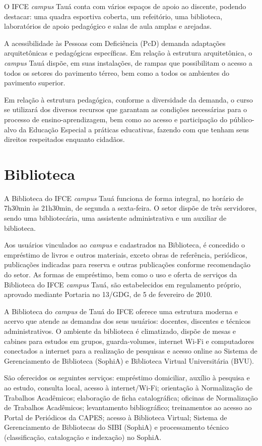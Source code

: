 \documentclass[
	12pt,				%
	openright,			%
	twoside,			%
	a4paper,			%
	chapter=TITLE,		%
	english,			%
	french,				%
	spanish,			%
	brazil,				%
	]{abntex2}
\begin{document}
O IFCE \textit{campus} Tauá conta com vários espaços de apoio ao discente,
podendo destacar: uma quadra esportiva coberta, um refeitório, uma biblioteca, laboratórios de apoio pedagógico e salas de aula amplas e arejadas.

A acessibilidade às Pessoas com Deficiência (PcD) demanda adaptações arquitetônicas e pedagógicas específicas. Em relação à estrutura arquitetônica, o  \textit{campus}  Tauá dispõe, em suas instalações, de rampas que possibilitam o acesso a todos os setores do pavimento térreo, bem como a todos os ambientes do pavimento superior.

Em relação à estrutura pedagógica, conforme a diversidade da demanda, o curso se utilizará dos diversos recursos que garantam as condições necessárias para o processo de ensino-aprendizagem, bem como ao acesso e participação do público-alvo da Educação Especial a práticas educativas, fazendo com que tenham seus direitos respeitados enquanto cidadãos.


\section{Biblioteca}

A Biblioteca do IFCE \textit{campus} Tauá funciona de forma integral, no horário de 7h30min às 21h30min, de segunda a sexta-feira. O setor dispõe de três servidores, sendo uma bibliotecária,  uma assistente administrativa e um auxiliar de biblioteca.

Aos usuários vinculados ao \textit{campus} e cadastrados na Biblioteca, é concedido o empréstimo de livros e outros materiais, exceto obras de referência, periódicos, publicações indicadas para reserva e outras publicações conforme recomendação do setor. As formas de empréstimo, bem como o uso e oferta de serviços da Biblioteca do IFCE \textit{campus} Tauá, são estabelecidos em regulamento próprio, aprovado mediante Portaria no 13/GDG, de 5 de fevereiro de 2010. 

A Biblioteca do \textit{campus} de Tauá do IFCE oferece uma estrutura moderna e acervo que atende as demandas dos seus usuários: docentes, discentes e técnicos administrativos. O ambiente da biblioteca é climatizado, dispõe de mesas e cabines para estudos em grupos, guarda-volumes, internet Wi-Fi e computadores conectados a internet para a realização de pesquisas e acesso online ao Sistema de Gerenciamento de Biblioteca (SophiA) e Biblioteca Virtual Universitária (BVU).

São oferecidos os seguintes serviços: empréstimo domiciliar, auxílio à pesquisa e ao estudo, consulta local, acesso à internet/Wi-Fi; orientação à Normalização de Trabalhos Acadêmicos; elaboração de ficha catalográfica; oficinas de Normalização de Trabalhos Acadêmicos; levantamento bibliográfico; treinamentos ao acesso ao Portal de Periódicos da CAPES; acesso à Biblioteca Virtual; Sistema de Gerenciamento de Bibliotecas do SIBI (SophiA) e processamento técnico (classificação, catalogação e indexação) no SophiA.
\end{document}
